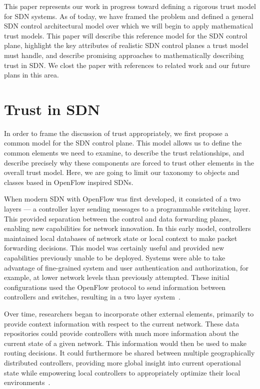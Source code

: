 \documentclass[10pt,letterpaper,twocolumn]{article}
\begin{document}
This paper represents our work in progress toward defining a rigorous trust model for SDN systems.  As of today, we have framed the problem and defined a general SDN control architectural model over which we will begin to apply mathematical trust models.  This paper will describe this reference model for the SDN control plane, highlight the key attributes of realistic SDN control planes a trust model must handle, and describe promising approaches to mathematically describing trust in SDN.  We clost the paper with references to related work and our future plans in this area.

\section{Trust in SDN}
In order to frame the discussion of trust appropriately, we first propose a common model for the SDN control plane.  This model allows us to define the common elements we need to examine, to describe the trust relationships, and describe precisely why these components are forced to trust other elements in the overall trust model.  Here, we are going to limit our taxonomy to objects and classes based in OpenFlow inspired SDNs.

When modern SDN with OpenFlow was first developed, it consisted of a two layers --- a controller layer sending messages to a programmable switching layer.  This provided separation between the control and data forwarding planes, enabling new capabilities for network innovation.  In this early model, controllers maintained local databases of network state or local context to make packet forwarding decisions.  This model was certainly useful and provided new capabilities previously unable to be deployed.  Systems were able to take advantage of fine-grained system and user authentication and authorization, for example, at lower network levels than previously attempted.  These initial configurations used the OpenFlow protocol to send information between controllers and switches, resulting in a two layer system~\cite{ORIGINAL_OF_WORK}.

Over time, researchers began to incorporate other external elements, primarily to provide context information with respect to the current network.  These data repositories could provide controllers with much more information about the current state of a given network.  This information would then be used to make routing decisions.  It could furthermore be shared between multiple geographically distributed controllers, providing more global insight into current operational state while empowering local controllers to appropriately optimize their local environments~\cite{CONTROLLER_PLACEMENT,LOCAL_ROUTING_OPT}.
\end{document}
